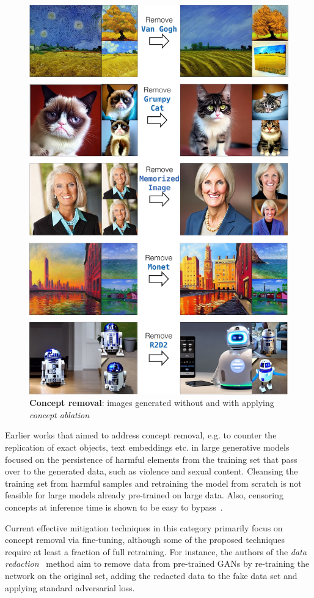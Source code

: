 \documentclass[conference,table]{IEEEtran} %
\begin{document}
\begin{figure}[ht]
    \centering
    \includegraphics[width=0.9\linewidth]{figures/ablating-concepts_vertical.png}
    \caption{\textbf{Concept removal}: images generated without and with applying \textit{concept ablation}~\cite{kumari_ablating_2023}}
    \label{fig:ablation}
\end{figure}
Earlier works that aimed to address concept removal, e.g. to counter the replication of exact objects, text embeddings etc. in large generative models focused on the persistence of harmful elements from the training set that pass over to the generated data, such as violence and sexual content. 
Cleansing the training set from harmful samples and retraining the model from scratch is not feasible for large models already pre-trained on large data. 
Also, censoring concepts at inference time is shown to be easy to bypass~\cite{rando_red-teaming_2022}.

Current effective mitigation techniques in this category primarily focus on concept removal via fine-tuning, although some of the proposed techniques require at least a fraction of full retraining. 
For instance, the authors of the \textit{data redaction}~\cite{kong_data_2023} method aim to remove data from pre-trained GANs by re-training the network on the original set, adding the redacted data to the fake data set and applying standard adversarial loss. 
\end{document}
